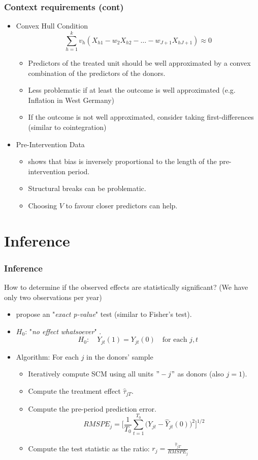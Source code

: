 \documentclass[xcolor=svgnames,t]{beamer}
\newcommand{\myitem}{\item[$\circ$]}
\begin{document}
\begin{frame}
    \frametitle{Context requirements (cont)}
   
    \begin{itemize}
        \item <1->  Convex Hull Condition
        $$\sum_{h=1}^{k} v_h \left( X_{h1} - w_2 X_{h2} - \dots - w_{J+1} X_{hJ+1} \right) \approx 0$$
        \begin{itemize}
            \myitem <2->  Predictors of the treated unit should be well approximated by a convex combination of the predictors of the donors.
            \myitem <3->  Less problematic if at least the outcome is well approximated (e.g. Inflation in West Germany)
            \myitem <4->  If the outcome is not well approximated, consider taking first-differences (similar to cointegration)
            
        \end{itemize}
        \item <5->  Pre-Intervention Data
        \begin{itemize}
            \myitem <6->  \cite{abadie2010synthetic} shows that bias is inversely proportional to the length of the pre-intervention period.
            \myitem <7->  Structural breaks can be problematic.
            \myitem <8->  Choosing $V$ to favour closer predictors can help.
            
        \end{itemize}
    \end{itemize}
    
\end{frame}
\section{Inference}
\begin{frame}
    \frametitle{Inference}
    How to determine if the observed effects are statistically significant? (We have only two observations per year)
    \begin{itemize}
        \item<1-> \cite{abadie2010synthetic} propose an "\textit{exact p-value}" test (similar to Fisher's test).
        \item<2-> \(H_0\): "\textit{no effect whatsoever}" \cite{firpo2018synthetic}.
        $$ H_0: \quad Y_{jt}(1)=Y_{jt}(0) \quad \text{for each } j,t$$
        \item<3-> Algorithm: For each $j$ in the donors' sample
         \begin{itemize}
            \myitem<4->  Iteratively compute SCM using all units $"-j"$ as donors (also $j=1$).
            \myitem<5->  Compute the treatment effect $\hat{\tau}_{jT}$.
            \myitem<6->  Compute the pre-period prediction error.
            \[ RMSPE_j=\Bigg[\frac{1}{T_0}\sum^{T_0}_{t=1}\Bigg(Y_{jt}-\hat{Y}_{jt}(0)\Bigg)^2 \Bigg]^{1/2}\]
            \myitem<7->  Compute the test statistic as the ratio: $r_j=\frac{\hat{\tau}_{jT}}{RMSPE_j}$
         \end{itemize}
       
    \end{itemize}
\end{frame}
\end{document}
